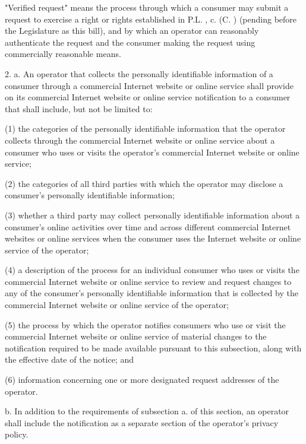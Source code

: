      "Verified request" means the process through which a consumer may submit a request to exercise a right or rights established in P.L.    , c.    (C.      ) (pending before the Legislature as this bill), and by which an operator can reasonably authenticate the request and the consumer making the request using commercially reasonable means.

 

     2.    a.   An operator that collects the personally identifiable information of a consumer through a commercial Internet website or online service shall provide on its commercial Internet website or online service notification to a consumer that shall include, but not be limited to:

     (1)   the categories of the personally identifiable information that the operator collects through the commercial Internet website or online service about a consumer who uses or visits the operator's commercial Internet website or online service;

     (2)   the categories of all third parties with which the operator may disclose a consumer's personally identifiable information;

     (3)   whether a third party may collect personally identifiable information about a consumer's online activities over time and across different commercial Internet websites or online services when the consumer uses the Internet website or online service of the operator;

     (4)   a description of the process for an individual consumer who uses or visits the commercial Internet website or online service to review and request changes to any of the consumer's personally identifiable information that is collected by the commercial Internet website or online service of the operator;

     (5)   the process by which the operator notifies consumers who use or visit the commercial Internet website or online service of material changes to the notification required to be made available pursuant to this subsection, along with the effective date of the notice; and

     (6)   information concerning one or more designated request addresses of the operator.

     b.    In addition to the requirements of subsection a. of this section, an operator shall include the notification as a separate section of the operator's privacy policy.

 

